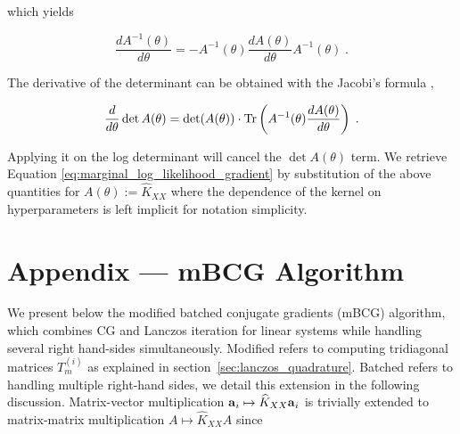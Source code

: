 \documentclass{article}
\begin{document}
which yields

\begin{equation*}
    \frac{d A^{-1}(\theta) }{d \theta} = - A^{-1}(\theta) \frac{d A(\theta)}{d \theta} A^{-1}(\theta) \; .
\end{equation*}


The derivative of the determinant can be obtained with the Jacobi's formula %
,

\begin{equation*}
    \frac{d}{d \theta} \det A(\theta) = \det (A(\theta)) \cdot \operatorname{Tr} \left( A^{-1}(\theta) \frac{d A(\theta)}{d \theta} \right) \; .
\end{equation*}

Applying it on the log determinant will cancel the $\det A(\theta)$ term. We retrieve Equation \eqref{eq:marginal_log_likelihood_gradient} by substitution of the above quantities for $A(\theta) := \widehat K_{XX}$ where the dependence of the kernel on hyperparameters is left implicit for notation simplicity.


\section{Appendix --- mBCG Algorithm} \label{sec:appendix_mbcg}


We present below the modified batched conjugate gradients (mBCG) algorithm, which combines CG and Lanczos iteration for linear systems while handling several right hand-sides simultaneously. 
Modified refers to computing tridiagonal matrices $T_m^{(i)}$ as explained in section~\ref{sec:lanczos_quadrature}. Batched refers to handling multiple right-hand sides, we detail this extension in the following discussion. Matrix-vector multiplication $\boldsymbol{\mathbf{a}}_i \mapsto \widehat K_{XX} \boldsymbol{\mathbf{a}}_i$ is trivially extended to matrix-matrix multiplication $A \mapsto \widehat K_{XX} A$ since
\end{document}
